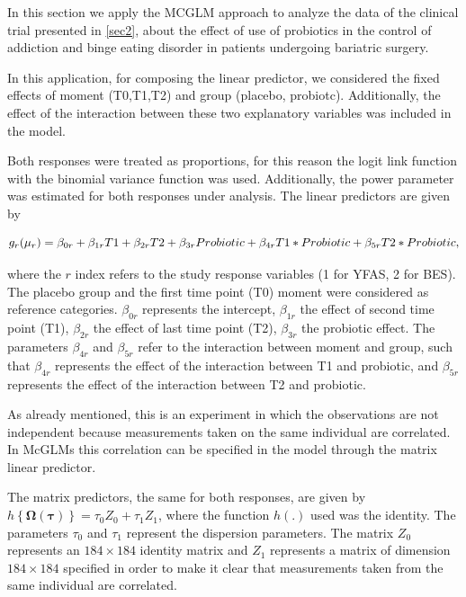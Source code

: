 \documentclass[AMA,STIX1COL]{WileyNJD-v2}
\begin{document}

In this section we apply the MCGLM approach to analyze the data of the clinical trial presented in \autoref{sec2}, about the effect of use of probiotics in the control of addiction and binge eating disorder in patients undergoing bariatric surgery.

In this application, for composing the linear predictor, we considered the fixed effects of moment (T0,T1,T2) and group (placebo, probiotc). Additionally, the effect of the interaction between these two explanatory variables was included in the model. 

Both responses were treated as proportions, for this reason the logit link function with the binomial variance function was used. Additionally, the power parameter was estimated for both responses under analysis. The linear predictors are given by

$$
g_{r}(\mu_{r}) = \beta_{0r} + \beta_{1r} T1 + \beta_{2r} T2 + \beta_{3r} Probiotic + \\ \beta_{4r} T1*Probiotic + \beta_{5r} T2*Probiotic,
$$

\noindent where the $r$ index refers to the study response variables (1 for YFAS, 2 for BES). The placebo group and the first time point (T0) moment were considered as reference categories. $\beta_{0r}$ represents the intercept, $\beta_{1r}$ the effect of second time point (T1), $\beta_{2r}$ the effect of last time point (T2), $\beta_{3r}$ the probiotic effect. The parameters $\beta_{4r}$ and $\beta_{5r}$ refer to the interaction between moment and group, such that $\beta_{4r}$ represents the effect of the interaction between T1 and probiotic, and $ \beta_{5r}$ represents the effect of the interaction between T2 and probiotic.

As already mentioned, this is an experiment in which the observations are not independent because measurements taken on the same individual are correlated. In McGLMs this correlation can be specified in the model through the matrix linear predictor.

The matrix predictors, the same for both responses, are given by $h\left \{ \boldsymbol{\Omega}(\boldsymbol{\tau}) \right \} = \tau_0Z_0 + \tau_1Z_1$, where the function $h(.)$ used was the identity. The parameters $\tau_0$ and $\tau_1$ represent the dispersion parameters. The matrix $Z_0$ represents an $184 \times 184$ identity matrix and $Z_1$ represents a matrix of dimension $184 \times 184$ specified in order to make it clear that measurements taken from the same individual are correlated. 
\end{document}

